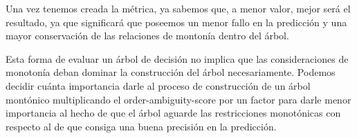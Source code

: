 Una vez tenemos creada la métrica, ya sabemos que, a menor valor, mejor será el resultado, ya que significará que poseemos un menor fallo en la predicción y una mayor conservación de las relaciones de montonía dentro del árbol.

Esta forma de evaluar un árbol de decisión no implica que las consideraciones de monotonía deban dominar la construcción del árbol necesariamente. Podemos decidir cuánta importancia darle al proceso de construcción de un árbol montónico multiplicando el order-ambiguity-score por un factor para darle menor importancia al hecho de que el árbol aguarde las restricciones monotónicas con respecto al de que consiga una buena precisión en la predicción. \cite{ref14}

\newpage


